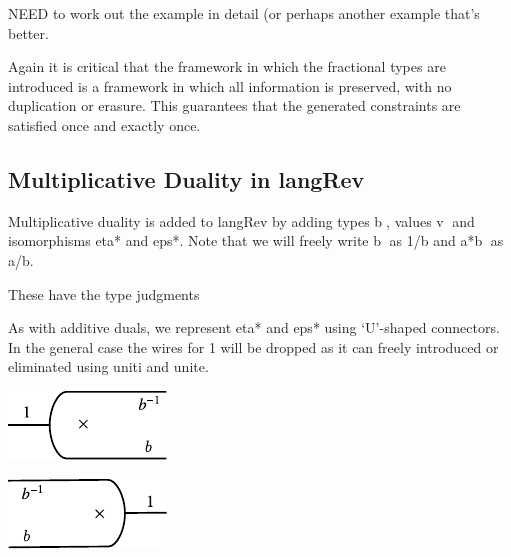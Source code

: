 \documentclass[preprint]{sigplanconf}
\begin{document}
NEED to work out the example in detail (or perhaps another example that's
better. 

Again it is critical that the framework in which the fractional types are
introduced is a framework in which all information is preserved, with no
duplication or erasure. This guarantees that the generated constraints are
satisfied once and exactly once. 

\subsection{Multiplicative Duality in {{langRev}} }

Multiplicative duality is added to {{langRev}} by adding types
{{b^^^}}, values {{v^^^}} and isomorphisms {{eta*}} and {{eps*}}.
Note that we will freely write {{b^^^}} as {{1/b}} and {{a*b^^^}} as
{{a/b}}.

%

\noindent
These have the type judgments



As with additive duals, we represent {{eta*}} and {{eps*}} using
`U'-shaped connectors. In the general case the wires for {{1}} will be
dropped as it can freely introduced or eliminated using {{uniti}} and
{{unite}}. 

\begin{multicols}{2}
\begin{center}
  \includegraphics{diagrams/eta_times.pdf}
\end{center}
  
\begin{center}
  \includegraphics{diagrams/eps_times.pdf}
\end{center}
\end{multicols}
\end{document}
